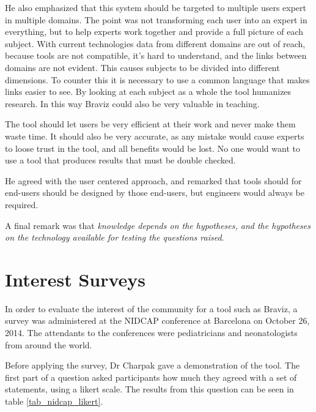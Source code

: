 He also emphasized that this system should be targeted to multiple users expert in multiple domains. The point was not transforming each user into an expert in everything, but to help experts work together and provide a full picture of each subject. With current technologies data from different domains are out of reach, because tools are not compatible, it's hard to understand, and the links between domains are not evident. This causes subjects to be divided into different dimensions. To counter this it is necessary to use a common language that makes links easier to see. By looking at each subject as a whole the tool humanizes research. In this way Braviz could also be very valuable in teaching. 

The tool should let users be very efficient at their work and never make them waste time. It should also be very accurate, as any mistake would cause experts to loose trust in the tool, and all benefits would be lost. No one would want to use a tool that produces results that must be double checked.

He agreed with the user centered approach, and remarked that tools should for end-users should be designed by those end-users, but engineers would always be required.

A final remark was that \emph{knowledge depends on the hypotheses, and the hypotheses on the technology available for testing the questions raised}. 





\section{Interest Surveys}

In order to evaluate the interest of the community for a tool such as Braviz, a survey was administered at the NIDCAP conference at Barcelona on October 26, 2014. The attendants to the conferences were pediatricians and neonatologists from around the world. 

Before applying the survey, Dr Charpak gave a demonstration of the tool. The first part of a question asked participants how much they agreed with a set of statements, using a likert scale. The results from this question can be seen in table \ref{tab_nidcap_likert}. 

